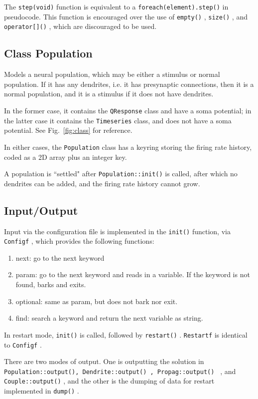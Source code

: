 \documentclass[12pt,a4paper]{article}
\newcommand{\type}[1]{ {\small\small\tt #1} }
\begin{document}
The \type{step(void)} function is equivalent to a \type{foreach(element).step()} in pseudocode. This function is encouraged over the use of \type{empty()}, \type{size()}, and \type{operator[]()}, which are discouraged to be used.

\subsection{Class Population}
\label{sec:newpop}

Models a neural population, which may be either a stimulus or normal population. If it has any dendrites, i.e. it has presynaptic connections, then it is a normal population, and it is a stimulus if it does not have dendrites.

In the former case, it contains the \type{QResponse} class and have a soma potential; in the latter case it contains the \type{Timeseries} class, and does not have a soma potential. See Fig.~\ref{fig:class} for reference.

In either cases, the \type{Population} class has a keyring storing the firing rate history, coded as a 2D array plus an integer key.

A population is ``settled" after \type{Population::init()} is called, after which no dendrites can be added, and the firing rate history cannot grow.

\subsection{Input/Output}

Input via the configuration file is implemented in the \type{init()} function, via \type{Configf}, which provides the following functions:
	\begin{enumerate}
	\item next: go to the next keyword
	\item param: go to the next keyword and reads in a variable. If the keyword is not found, barks and exits.
	\item optional: same as param, but does not bark nor exit.
	\item find: search a keyword and return the next variable as string.
	\end{enumerate}

In restart mode, \type{init()} is called, followed by \type{restart()}. \type{Restartf} is identical to \type{Configf}.

There are two modes of output. One is outputting the solution in \type{Population::output(), \type{Dendrite::output()}, \type{Propag::output()}}, and \type{Couple::output()}, and the other is the dumping of data for restart implemented in \type{dump()}.
\end{document}
